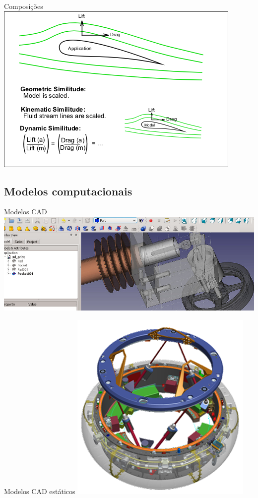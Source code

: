\documentclass{beamer}
\begin{document}
\begin{frame}{Composições}
  \centering
  \includegraphics[width=.8\textwidth]{modelos/Similitude_(model)}
\end{frame}

\subsection{Modelos computacionais}

\begin{frame}{Modelos CAD}
  \centering
  \includegraphics[width=\textwidth]{modelos/Freecad_screenshot_--_Engine_by_bejant}
\end{frame}

\begin{frame}{Modelos CAD estáticos}
  \centering
  \includegraphics[height=.8\textheight]{modelos/NDS_CAD_drawing}
\end{frame}
\end{document}

